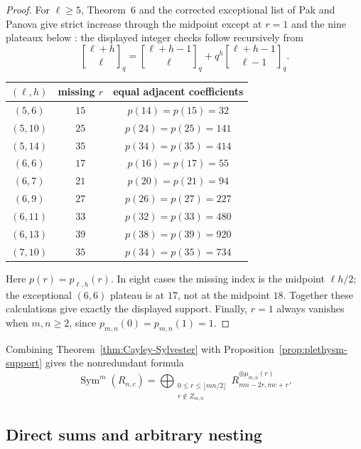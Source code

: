 \documentclass[11pt,reqno]{amsart}
\theoremstyle{definition}
\theoremstyle{remark}
\newcommand{\Sym}{\operatorname{Sym}}
\newcommand{\qbinom}[2]{\genfrac{[}{]}{0pt}{}{#1}{#2}}
\begin{document}
\begin{proof}
For $\ell\geq5$, Theorem~6 and the corrected exceptional list of Pak and
Panova give strict increase through the midpoint except at $r=1$ and the
nine plateaux below \cite[Theorem~6 and the correction]{PakPanova}:
the displayed integer checks follow recursively from
\begin{equation*}
 \qbinom{\ell+h}{\ell}_q
 =\qbinom{\ell+h-1}{\ell}_q
 +q^h\qbinom{\ell+h-1}{\ell-1}_q.
\end{equation*}
\begin{center}
\begin{tabular}{@{}ccc@{}}
\toprule
$(\ell,h)$ & missing $r$ & equal adjacent coefficients \\
\midrule
$(5,6)$ & $15$ & $p(14)=p(15)=32$ \\
$(5,10)$ & $25$ & $p(24)=p(25)=141$ \\
$(5,14)$ & $35$ & $p(34)=p(35)=414$ \\
$(6,6)$ & $17$ & $p(16)=p(17)=55$ \\
$(6,7)$ & $21$ & $p(20)=p(21)=94$ \\
$(6,9)$ & $27$ & $p(26)=p(27)=227$ \\
$(6,11)$ & $33$ & $p(32)=p(33)=480$ \\
$(6,13)$ & $39$ & $p(38)=p(39)=920$ \\
$(7,10)$ & $35$ & $p(34)=p(35)=734$ \\
\bottomrule
\end{tabular}
\end{center}
Here $p(r)=p_{\ell,h}(r)$.  In eight cases the missing index is the
midpoint $\ell h/2$; the exceptional $(6,6)$ plateau is at $17$, not at the
midpoint $18$.  Together these calculations give exactly the displayed
support.  Finally, $r=1$ always vanishes when $m,n\geq2$, since
$p_{m,n}(0)=p_{m,n}(1)=1$.
\end{proof}

Combining Theorem~\ref{thm:Cayley-Sylvester} with
Proposition~\ref{prop:plethysm-support} gives the nonredundant formula
\begin{equation}\label{eq:plethysm-nonredundant}
 \Sym^m(R_{n,c})
 =
 \bigoplus_{\substack{0\leq r\leq\lfloor mn/2\rfloor\\r\notin Z_{m,n}}}
 R_{mn-2r,mc+r}^{\oplus\mu_{m,n}(r)}.
\end{equation}

\subsection{Direct sums and arbitrary nesting}
\end{document}
